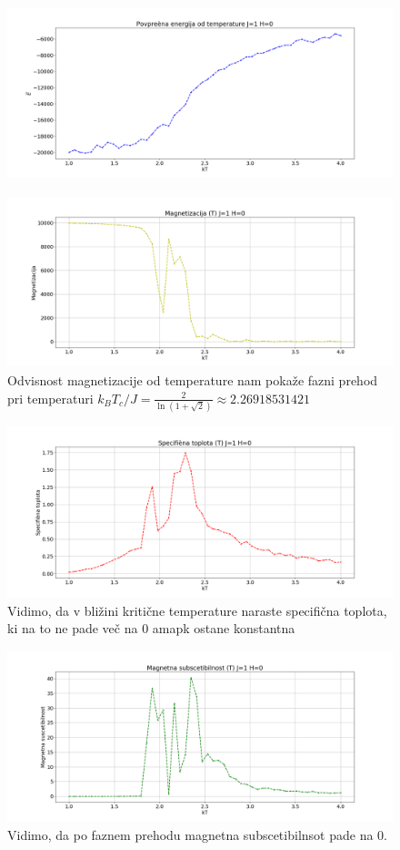 \documentclass[11pt, a4paper]{article}
\begin{document}
 \begin{figure}[H]
\centering
  \includegraphics[width=17cm, height=5cm]{druga_energija.png}

\end{figure}  
 \begin{figure}[H]
\centering
  \includegraphics[width=17cm, height=5cm]{druga_magnetizacija.png}
\caption{Odvisnost magnetizacije od temperature nam pokaže fazni prehod pri temperaturi $k_B T_c/J = \frac{2}{\ln(1+\sqrt{2})} \approx 2.26918531421$}

\end{figure}  
 \begin{figure}[H]
\centering
  \includegraphics[width=17cm, height=5cm]{specificna_toplota.png}
\caption{Vidimo, da v bližini kritične temperature naraste specifična toplota, ki na to ne pade več na 0 amapk ostane konstantna}

\end{figure}  
 \begin{figure}[H]
\centering
  \includegraphics[width=17cm, height=5cm]{subscetiblnost.png}
\caption{Vidimo, da po faznem prehodu magnetna subscetibilnsot pade na 0.}

\end{figure} 
\end{document}
